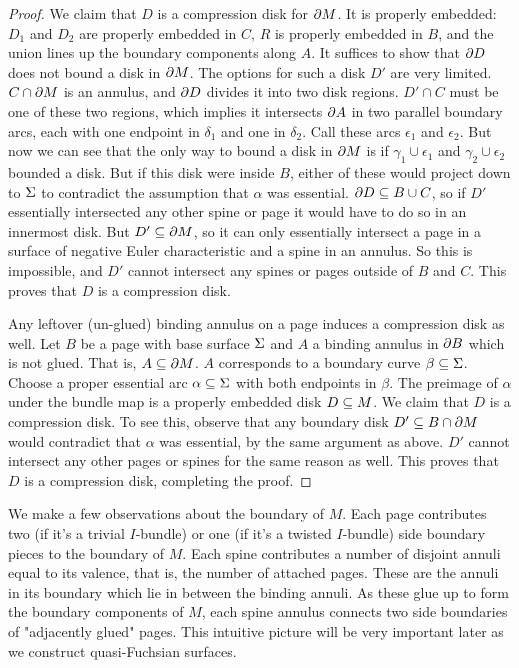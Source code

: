 \begin{proof}
We claim that $D$ is a compression disk for $\partial M$. It is properly embedded:
$D_1$ and $D_2$ are properly embedded in $C$, $R$ is properly embedded in $B$,
and the union lines up the boundary components along $A$. It suffices to show
that $\partial D$ does not bound a disk in $\partial M$. The options for such a disk $D'$
are very limited.  $C \cap \partial M$ is an annulus, and $\partial D$ divides it into
two disk regions. $D' \cap C$ must be one of these two regions, which implies
it intersects $\partial A$ in two parallel boundary arcs, each with one endpoint in
$\delta_1$ and one in $\delta_2$.  Call these arcs $\epsilon_1$ and
$\epsilon_2$.  But now we can see that the only way to bound a disk in $\partial M$
is if $\gamma_1 \cup \epsilon_1$ and $\gamma_2 \cup \epsilon_2$ bounded a disk.
But if this disk were inside $B$, either of these would project down to $\Sigma$
to contradict the assumption that $\alpha$ was essential. $\partial D \subseteq B \cup
C$, so if $D'$ essentially intersected any other spine or page it would have to
do so in an innermost disk. But $D' \subseteq \partial M$, so it can only essentially
intersect a page in a surface of negative Euler characteristic and a spine in
an annulus. So this is impossible, and $D'$ cannot intersect any spines or
pages outside of $B$ and $C$. This proves that $D$ is a compression disk.

Any leftover (un-glued) binding annulus on a page induces a compression disk as
well. Let $B$ be a page with base surface $\Sigma$ and $A$ a binding annulus in
$\partial B$ which is not glued. That is, $A \subseteq \partial M$. $A$ corresponds to
a boundary curve $\beta \subseteq \Sigma$. Choose a proper essential arc $\alpha \subseteq
\Sigma$ with both endpoints in $\beta$. The preimage of $\alpha$ under the bundle
map is a properly embedded disk $D \subseteq M$. We claim that $D$ is a compression
disk. To see this, observe that any boundary disk $D' \subseteq B \cap \partial M$ would
contradict that $\alpha$ was essential, by the same argument as above. $D'$
cannot intersect any other pages or spines for the same reason as well. This
proves that $D$ is a compression disk, completing the proof.

\end{proof}

We make a few observations about the boundary of $M$. Each page contributes two
(if it's a trivial $I$-bundle) or one (if it's a twisted $I$-bundle) side
boundary pieces to the boundary of $M$. Each spine contributes a number of
disjoint annuli equal to its valence, that is, the number of attached pages.
These are the annuli in its boundary which lie in between the binding annuli.
As these glue up to form the boundary components of $M$, each spine annulus
connects two side boundaries of "adjacently glued" pages. This intuitive
picture will be very important later as we construct quasi-Fuchsian surfaces.

